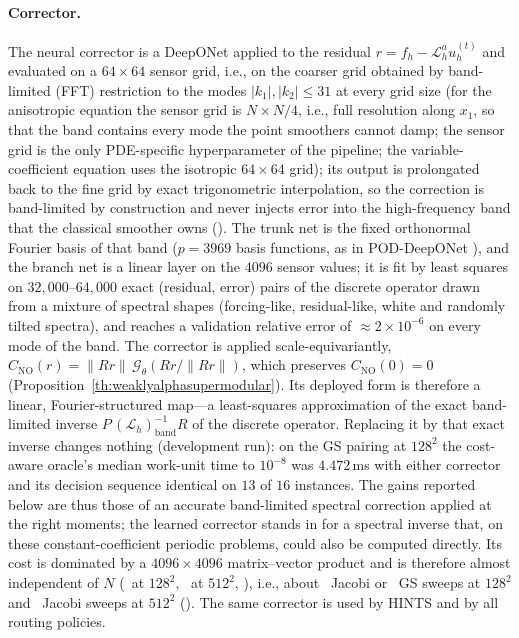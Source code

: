 \paragraph{Corrector.} The neural corrector is a DeepONet applied to the residual $r = f_h - \mathcal{L}_h^a u^{(t)}_h$ and evaluated on a $64\times 64$ sensor grid, i.e., on the coarser grid obtained by band-limited (FFT) restriction to the modes $|k_1|,|k_2| \le 31$ at every grid size (for the anisotropic equation the sensor grid is $N\times N/4$, i.e., full resolution along $x_1$, so that the band contains every mode the point smoothers cannot damp; the sensor grid is the only PDE-specific hyperparameter of the pipeline; the variable-coefficient equation uses the isotropic $64\times64$ grid); its output is prolongated back to the fine grid by exact trigonometric interpolation, so the correction is band-limited by construction and never injects error into the high-frequency band that the classical smoother owns (). The trunk net is the fixed orthonormal Fourier basis of that band ($p = 3969$ basis functions, as in POD-DeepONet \citep{lu2022comprehensive}), and the branch net is a linear layer on the $4096$ sensor values; it is fit by least squares on $32{,}000$--$64{,}000$ exact (residual, error) pairs of the discrete operator drawn from a mixture of spectral shapes (forcing-like, residual-like, white and randomly tilted spectra), and reaches a validation relative error of $\approx 2\times 10^{-6}$ on every mode of the band. The corrector is applied scale-equivariantly, $C_{\mathrm{NO}}(r) = \|Rr\|\,\mathcal{G}_\theta(Rr/\|Rr\|)$, which preserves $C_{\mathrm{NO}}(0) = 0$ (Proposition~\ref{th:weaklyalphasupermodular}). Its deployed form is therefore a linear, Fourier-structured map---a least-squares approximation of the exact band-limited inverse $P\,(\mathcal{L}_h)_{\text{band}}^{-1}R$ of the discrete operator. Replacing it by that exact inverse changes nothing (development run): on the GS pairing at $128^2$ the cost-aware oracle's median work-unit time to $10^{-8}$ was $4.472$\,ms with either corrector and its decision sequence identical on $13$ of $16$ instances. The gains reported below are thus those of an accurate band-limited spectral correction applied at the right moments; the learned corrector stands in for a spectral inverse that, on these constant-coefficient periodic problems, could also be computed directly. Its cost is dominated by a $4096\times 4096$ matrix--vector product and is therefore almost independent of $N$ (\caCostNo\ at $128^2$, \caCostNoC\ at $512^2$, ), i.e., about \caMJacobi\ Jacobi or \caMGs\ GS sweeps at $128^2$ and \caMJacobiC\ Jacobi sweeps at $512^2$ (). The same corrector is used by HINTS and by all routing policies.

